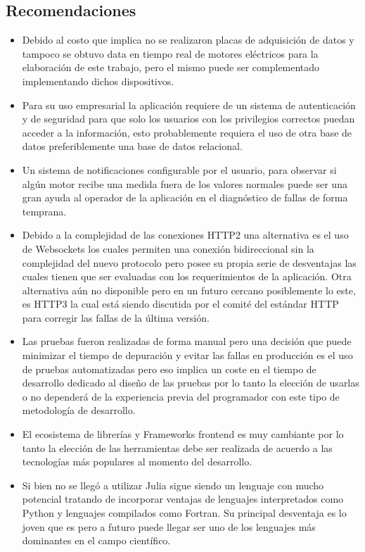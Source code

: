 \subsection{Recomendaciones}
\begin{itemize}
    \item Debido al costo que implica no se realizaron placas de adquisición de
        datos y tampoco se obtuvo data en tiempo real de motores eléctricos
        para la elaboración de este trabajo, pero el mismo puede ser
        complementado implementando dichos dispositivos.

    \item Para su uso empresarial la aplicación requiere de un sistema de
        autenticación y de seguridad para que solo los usuarios con los
        privilegios correctos puedan acceder a la información, esto
        probablemente requiera el uso de otra base de datos preferiblemente una
        base de datos relacional.

    \item Un sistema de notificaciones configurable por el usuario, para
        observar si algún motor recibe una medida fuera de los valores normales
        puede ser una gran ayuda al operador de la aplicación en el diagnóstico
        de fallas de forma temprana.

    \item Debido a la complejidad de las conexiones HTTP2 una alternativa es el
        uso de Websockets los cuales permiten una conexión bidireccional sin la
        complejidad del nuevo protocolo pero posee su propia serie de
        desventajas las cuales tienen que ser evaluadas con los requerimientos
        de la aplicación. Otra alternativa aún no disponible pero en un futuro
        cercano posiblemente lo este, es HTTP3 la cual está siendo discutida
        por el comité del estándar HTTP para corregir las fallas de la última
        versión.

    \item Las pruebas fueron realizadas de forma manual pero una decisión que
        puede minimizar el tiempo de depuración y evitar las fallas en
        producción es el uso de pruebas automatizadas pero eso implica un coste
        en el tiempo de desarrollo dedicado al diseño de las pruebas por lo
        tanto la elección de usarlas o no dependerá de la experiencia previa
        del programador con este tipo de metodología de desarrollo.

    \item El ecosistema de librerías y Frameworks frontend es muy cambiante por
        lo tanto la elección de las herramientas debe ser realizada de acuerdo
        a las tecnologías más populares al momento del desarrollo.

    \item  Si bien no se llegó a utilizar Julia sigue siendo un lenguaje con
        mucho potencial tratando de incorporar ventajas de lenguajes
        interpretados como Python y lenguajes compilados como Fortran. Su
        principal desventaja es lo joven que es pero a futuro puede llegar ser
        uno de los lenguajes más dominantes en el campo científico.

\end{itemize}
